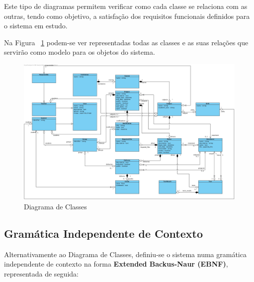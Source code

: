 Este tipo de diagramas permitem verificar como cada classe se relaciona com as outras, tendo como objetivo, a satisfação dos requisitos funcionais definidos para o sistema em estudo.

Na Figura ~\ref{fig:diagrama-classes} podem-se ver representadas todas as classes e as suas relações que servirão como modelo para os objetos do sistema.

\begin{figure}[H]
  \centering
  \includegraphics[width=1\textwidth,center]{images/modelo_dados/diagrama-classes}
  \caption{Diagrama de Classes}
  \label{fig:diagrama-classes}
\end{figure}

\subsection{Gramática Independente de Contexto}

Alternativamente ao Diagrama de Classes, definiu-se o sistema numa gramática independente de contexto na forma \textbf{Extended Backus-Naur (EBNF)}, representada de seguida:

